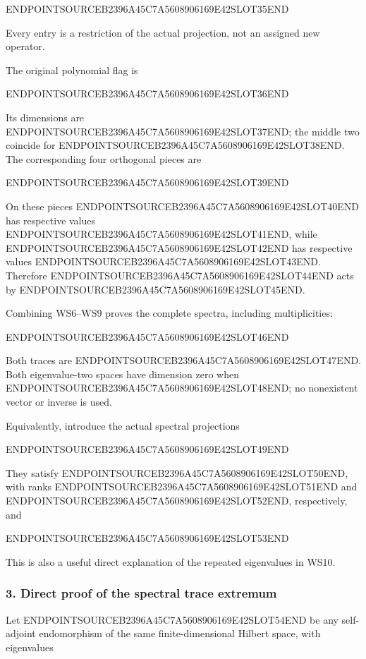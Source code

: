 ENDPOINTSOURCEB2396A45C7A5608906169E42SLOT35END

Every entry is a restriction of the actual projection, not an assigned new operator.

The original polynomial flag is

ENDPOINTSOURCEB2396A45C7A5608906169E42SLOT36END

Its dimensions are ENDPOINTSOURCEB2396A45C7A5608906169E42SLOT37END; the middle two coincide for ENDPOINTSOURCEB2396A45C7A5608906169E42SLOT38END. The corresponding four orthogonal pieces are

ENDPOINTSOURCEB2396A45C7A5608906169E42SLOT39END

On these pieces ENDPOINTSOURCEB2396A45C7A5608906169E42SLOT40END has respective values ENDPOINTSOURCEB2396A45C7A5608906169E42SLOT41END, while ENDPOINTSOURCEB2396A45C7A5608906169E42SLOT42END has respective values ENDPOINTSOURCEB2396A45C7A5608906169E42SLOT43END. Therefore ENDPOINTSOURCEB2396A45C7A5608906169E42SLOT44END acts by ENDPOINTSOURCEB2396A45C7A5608906169E42SLOT45END.

Combining WS6--WS9 proves the complete spectra, including multiplicities:

ENDPOINTSOURCEB2396A45C7A5608906169E42SLOT46END

Both traces are ENDPOINTSOURCEB2396A45C7A5608906169E42SLOT47END. Both eigenvalue-two spaces have dimension zero when ENDPOINTSOURCEB2396A45C7A5608906169E42SLOT48END; no nonexistent vector or inverse is used.

Equivalently, introduce the actual spectral projections

ENDPOINTSOURCEB2396A45C7A5608906169E42SLOT49END

They satisfy ENDPOINTSOURCEB2396A45C7A5608906169E42SLOT50END, with ranks ENDPOINTSOURCEB2396A45C7A5608906169E42SLOT51END and ENDPOINTSOURCEB2396A45C7A5608906169E42SLOT52END, respectively, and

ENDPOINTSOURCEB2396A45C7A5608906169E42SLOT53END

This is also a useful direct explanation of the repeated eigenvalues in WS10.

\subsubsection{3. Direct proof of the spectral trace extremum}\label{endpoint-window_review--direct-proof-of-the-spectral-trace-extremum}

Let ENDPOINTSOURCEB2396A45C7A5608906169E42SLOT54END be any self-adjoint endomorphism of the same finite-dimensional Hilbert space, with eigenvalues

